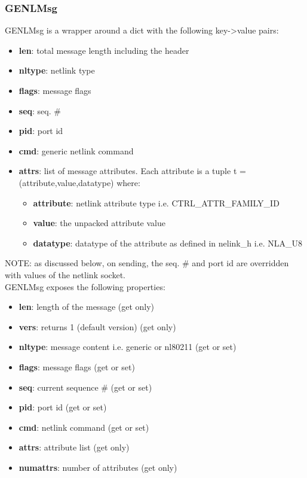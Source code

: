 \documentclass[11pt]{article}
\begin{document}
\begin{appendices}
\subsubsection{GENLMsg}
GENLMsg is a wrapper around a dict with the following key->value pairs:
\begin{itemize}
\item \textbf{len}: total message length including the header
\item \textbf{nltype}: netlink type
\item \textbf{flags}: message flags
\item \textbf{seq}: seq. \#
\item \textbf{pid}: port id
\item \textbf{cmd}: generic netlink command
\item \textbf{attrs}: list of message attributes. Each attribute is a tuple t =
(attribute,value,datatype) where:
\begin{itemize}
\item \textbf{attribute}: netlink attribute type i.e. CTRL\_ATTR\_FAMILY\_ID
\item \textbf{value}: the unpacked attribute value
\item \textbf{datatype}: datatype of the attribute as defined in nelink\_h i.e.
NLA\_U8
\end{itemize}
\end{itemize}
NOTE: as discussed below, on sending, the seq. \# and port id are overridden with
values of the netlink socket.\\

GENLMsg exposes the following properties:
\begin{itemize}
\item \textbf{len}: length of the message (get only)
\item \textbf{vers}: returns 1 (default version) (get only)
\item \textbf{nltype}: message content i.e. generic or nl80211 (get or set)
\item \textbf{flags}: message flags (get or set)
\item \textbf{seq}: current sequence \# (get or set)
\item \textbf{pid}: port id (get or set)
\item \textbf{cmd}: netlink command (get or set)
\item \textbf{attrs}: attribute list (get only)
\item \textbf{numattrs}: number of attributes (get only)
\end{itemize}


\end{appendices}
\end{document}
